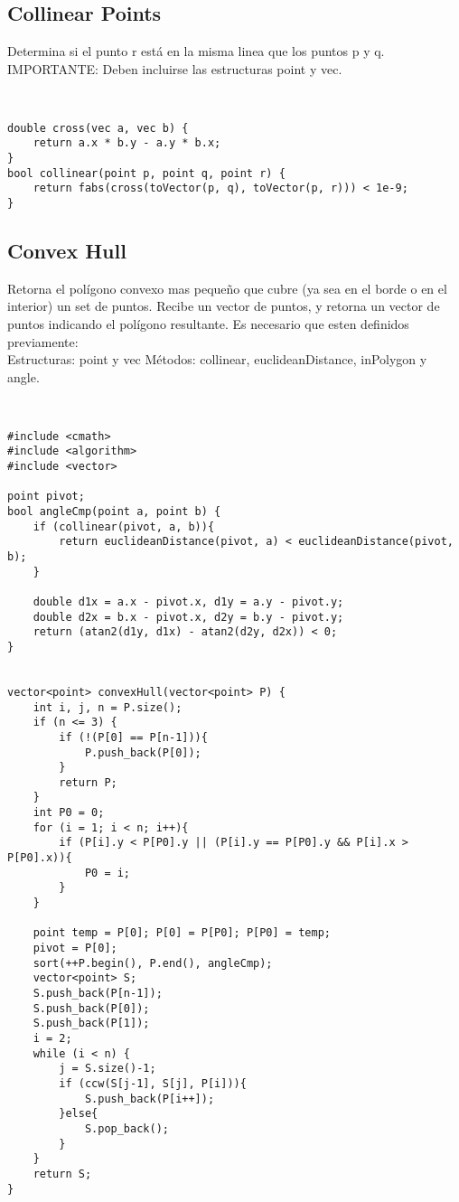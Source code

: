\documentclass[11pt,letterpaper,twocolumn,twosided]{article}
\begin{document}
\subsection{Collinear Points}
Determina si el punto r est\'a en la misma linea que los puntos p y q. IMPORTANTE: Deben incluirse las estructuras point y vec.
\begin{lstlisting}


double cross(vec a, vec b) { 
	return a.x * b.y - a.y * b.x; 
}
bool collinear(point p, point q, point r) {
	return fabs(cross(toVector(p, q), toVector(p, r))) < 1e-9; 
}
\end{lstlisting}

\subsection{Convex Hull}
Retorna el pol\'igono convexo mas peque\~no que cubre (ya sea en el borde o en el interior) un set de puntos. Recibe un vector de puntos, y retorna un vector de puntos indicando el pol\'igono resultante. Es necesario que esten definidos previamente: \\
Estructuras: point y vec
M\'etodos: collinear, euclideanDistance, inPolygon y angle.
\begin{lstlisting}


#include <cmath>
#include <algorithm>
#include <vector>

point pivot;
bool angleCmp(point a, point b) {                
	if (collinear(pivot, a, b)){
		return euclideanDistance(pivot, a) < euclideanDistance(pivot, b);
	}                              
        
  	double d1x = a.x - pivot.x, d1y = a.y - pivot.y;
  	double d2x = b.x - pivot.x, d2y = b.y - pivot.y;
  	return (atan2(d1y, d1x) - atan2(d2y, d2x)) < 0; 
}


vector<point> convexHull(vector<point> P) {  
  	int i, j, n = P.size();
  	if (n <= 3) {
    	if (!(P[0] == P[n-1])){
    		P.push_back(P[0]);
    	}  
    	return P;
  	}
  	int P0 = 0;
  	for (i = 1; i < n; i++){
  		if (P[i].y < P[P0].y || (P[i].y == P[P0].y && P[i].x > P[P0].x)){
  	 		P0 = i;
  	 	}
  	}

  	point temp = P[0]; P[0] = P[P0]; P[P0] = temp; 
	pivot = P[0];
  	sort(++P.begin(), P.end(), angleCmp);     
	vector<point> S;
  	S.push_back(P[n-1]); 
  	S.push_back(P[0]); 
  	S.push_back(P[1]);   
  	i = 2;                                         
  	while (i < n) {           
    	j = S.size()-1;
    	if (ccw(S[j-1], S[j], P[i])){
    		S.push_back(P[i++]);
    	}else{
    		S.pop_back();
    	}  
    }  
  	return S; 
}  
\end{lstlisting}
\end{document}
